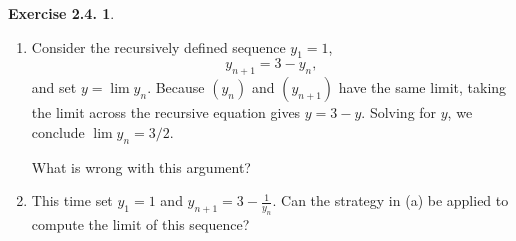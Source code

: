 \documentclass[12pt]{article}
\theoremstyle{definition}
\theoremstyle{exercise}
\newtheorem{exercise}{Exercise 2.4.}
\theoremstyle{solution}
\begin{document}
\begin{exercise}
\label{ex:2}
    \begin{enumerate}
        \item Consider the recursively defined sequence \( y_1 = 1 \),
        \[
            y_{n+1} = 3 - y_n,
        \]
        and set \( y = \lim y_n \). Because \( (y_n) \) and \( (y_{n+1}) \) have the same limit, taking the limit across the recursive equation gives \( y = 3 - y \). Solving for \( y \), we conclude \( \lim y_n = 3/2 \).

        What is wrong with this argument?

        \item This time set \( y_1 = 1 \) and \( y_{n+1} = 3 - \frac{1}{y_n} \). Can the strategy in (a) be applied to compute the limit of this sequence?
    \end{enumerate}
\end{exercise}
\end{document}
